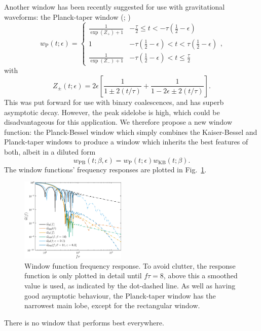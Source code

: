 \documentclass[useAMS,usedcolumn,usegraphicx,usenatbib]{mn2e}
\newcommand{\figref}[1]{Fig.~\ref{fig:#1}}
\newcommand{\sub}[1]{\ensuremath{_\mathrm{#1}}}
\newcommand{\recip}[1]{\ensuremath{\frac{1}{#1}}}
\begin{document}
Another window has been recently suggested for use with gravitational waveforms: the Planck-taper window (\citealt*{Damour2000}; \citealt{McKechan2010})
\begin{equation}
w\sub{P}(t; \epsilon) = \begin{cases}
 {\displaystyle \recip{\exp(Z_+)+1}} & {\displaystyle -\frac{\tau}{2} \leq t < -\tau\left(\recip{2} - \epsilon\right)} \\
 1 & {\displaystyle -\tau\left(\recip{2} - \epsilon\right) < t < \tau\left(\recip{2} - \epsilon\right)} \\
 {\displaystyle \recip{\exp(Z_-)+1}} & {\displaystyle -\tau\left(\recip{2} - \epsilon\right) < t \leq \frac{\tau}{2}}
\end{cases},
\end{equation}
with
\begin{equation}
Z_\pm(t; \epsilon) = 2\epsilon\left[\recip{1 \pm 2(t/\tau)} + \recip{1 - 2\epsilon \pm 2(t/\tau)}\right].
\end{equation}
This was put forward for use with binary coalescences, and has superb asymptotic decay. However, the peak sidelobe is high, which could be disadvantageous for this application. We therefore propose a new window function: the Planck-Bessel window which simply combines the Kaiser-Bessel and Planck-taper windows to produce a window which inherits the best features of both, albeit in a diluted form
\begin{equation}
w\sub{PB}(t;\beta,\epsilon) = w\sub{P}(t; \epsilon)w\sub{KB}(t;\beta).
\end{equation}
The window functions' frequency responses are plotted in \figref{Response}.
\begin{figure}
  \begin{center}
  \includegraphics[width=0.45\textwidth]{Fig_Response}
    \caption{Window function frequency response. To avoid clutter, the response function is only plotted in detail until $f\tau = 8$, above this a smoothed value is used, as indicated by the dot-dashed line. As well as having good asymptotic behaviour, the Planck-taper window has the narrowest main lobe, except for the rectangular window.}
    \label{fig:Response}
  \end{center}
\end{figure}
There is no window that performs best everywhere.
\end{document}
